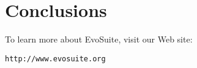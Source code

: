 \documentclass[10pt,conference,compsocconf]{IEEEtran}
\newcommand{\EVOSUITE}{{\sc EvoSuite}\xspace}
\begin{document}
\section{Conclusions}


To learn more about \EVOSUITE, visit our Web site:
\begin{center}
\texttt{http://www.evosuite.org}
\end{center}






\def\IEEEbibitemsep{6pt}



\end{document}
